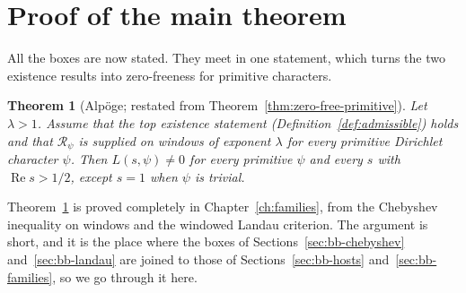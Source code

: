 \documentclass[11pt]{amsbook}
\theoremstyle{plain}
\newtheorem{theorem}{Theorem}[section]
\theoremstyle{definition}
\theoremstyle{remark}
\numberwithin{equation}{section}
\numberwithin{figure}{chapter}
\numberwithin{table}{chapter}
\begin{document}
\section{Proof of the main theorem}
\label{sec:proof-main}

All the boxes are now stated. They meet in one statement, which
turns the two existence results into zero-freeness for primitive
characters.

\begin{theorem}[Alp\"oge; restated from
Theorem~\ref{thm:zero-free-primitive}]
\label{bb:zero-free-primitive}
Let $\lambda>1$. Assume that the top existence statement
(Definition~\ref{def:admissible}) holds and that
$\mathscr R_\psi$ is supplied on windows of exponent $\lambda$ for every
primitive
Dirichlet character $\psi$. Then $L(s,\psi)\ne0$ for every primitive
$\psi$ and every $s$ with $\operatorname{Re}s>1/2$, except $s=1$ when
$\psi$ is trivial.
\end{theorem}

\noindent Theorem~\ref{bb:zero-free-primitive} is proved completely
in Chapter~\ref{ch:families}, from the Chebyshev inequality on
windows and the windowed Landau criterion. The argument is short,
and it is the place where the boxes of
Sections~\ref{sec:bb-chebyshev} and~\ref{sec:bb-landau} are joined
to those of Sections~\ref{sec:bb-hosts} and~\ref{sec:bb-families},
so we go through it here.
\end{document}

